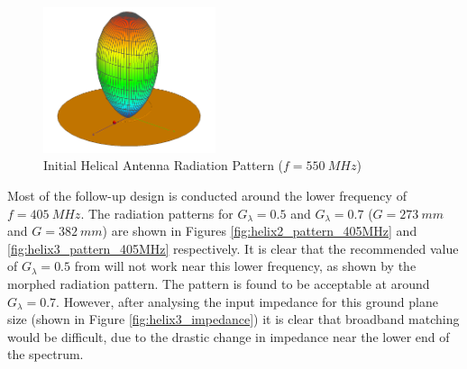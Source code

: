 \begin{figure}[!htb]
  \centering
  \includegraphics[width=0.45\textwidth]{helix1_pattern_550MHz}
  \caption{Initial Helical Antenna Radiation Pattern ($f=\SI{550}{MHz}$)}
  \label{fig:helix1_pattern_550MHz}
\end{figure}

Most of the follow-up design is conducted around the lower frequency of $f = \SI{405}{MHz}$. The radiation patterns for $G_\lambda = 0.5$ and $G_\lambda = 0.7$ ($G = \SI{273}{mm}$ and $G = \SI{382}{mm}$) are shown in Figures \ref{fig:helix2_pattern_405MHz} and \ref{fig:helix3_pattern_405MHz} respectively. It is clear that the recommended value of $G_\lambda = 0.5$ from \cite{textbook-antennaTheoryAnalysisDesign} will not work near this lower frequency, as shown by the morphed radiation pattern. The pattern is found to be acceptable at around $G_\lambda = 0.7$. However, after analysing the input impedance for this ground plane size (shown in Figure \ref{fig:helix3_impedance}) it is clear that broadband matching would be difficult, due to the drastic change in impedance near the lower end of the spectrum.

